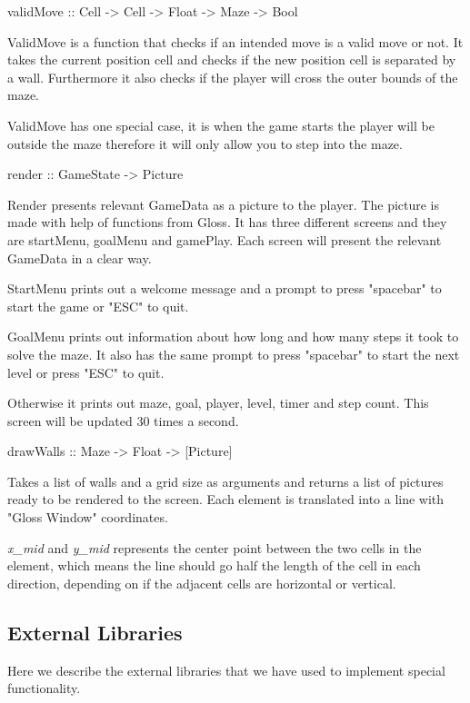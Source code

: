 \documentclass[12pt, a4paper]{article}
\begin{document}
\begin{code}
    validMove :: Cell -> Cell -> Float -> Maze -> Bool
\end{code}
ValidMove is a function that checks if an intended move is a valid move or not. It takes the current position cell and checks if the new position cell is separated by a wall.
Furthermore it also checks if the player will cross the outer bounds of the maze.
 
ValidMove has one special case, it is when the game starts the player will be outside the maze therefore it will only allow you to step into the maze.


\begin{code}
    render :: GameState -> Picture
\end{code}
Render presents relevant GameData as a picture to the player. The picture is made with help of functions from Gloss. It has three different screens and they are startMenu, goalMenu and gamePlay. Each screen will present the relevant GameData in a clear way.
 
StartMenu prints out a welcome message and a prompt to press "spacebar" to start the game or "ESC" to quit.
 
GoalMenu prints out information about how long and how many steps it took to solve the maze. It also has the same prompt to press "spacebar" to start the next level or press "ESC" to quit.
 
Otherwise it prints out maze, goal, player, level, timer and step count. This screen will be updated 30 times a second.


\begin{code}
drawWalls :: Maze -> Float -> [Picture]
\end{code}
Takes a list of walls and a grid size as arguments and returns a list of pictures ready to be rendered to the screen. Each element is translated into a line with "Gloss Window" coordinates. 

\textit{x\_mid} and \textit{y\_mid} represents the center point between the two cells in the element, which means the line should go half the length of the cell in each direction, depending on if the adjacent cells are horizontal or vertical.





\subsection{External Libraries}
Here we describe the external libraries that we have used to implement special functionality.
\end{document}
